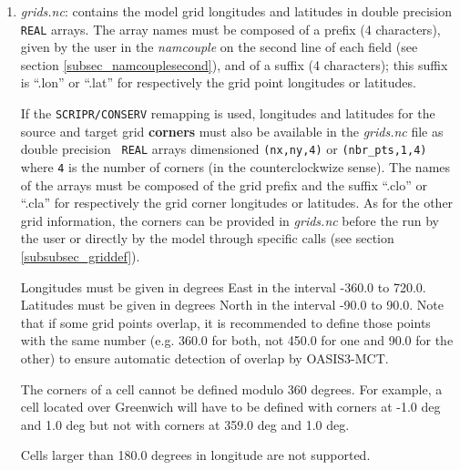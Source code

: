 \begin{enumerate}

\item {\em grids.nc}: contains the model grid longitudes and latitudes
  in double precision {\tt REAL} arrays. The array names must be
  composed of a prefix (4 characters), given by the user in the {\it
    namcouple} on the second line of each field (see section
  \ref{subsec_namcouplesecond}), and of a suffix (4 characters); this
  suffix is ``.lon'' or ``.lat'' for respectively the grid point
  longitudes or latitudes.

  If the {\tt SCRIPR/CONSERV} remapping is used, longitudes and
  latitudes for the source and target grid {\bf corners} must also be
  available in the {\em grids.nc} file as double precision {\tt
    REAL} arrays dimensioned {\tt (nx,ny,4)} or {\tt (nbr\_pts,1,4)}
  where {\tt 4} is the number of corners (in the counterclockwize
  sense). The names of the arrays must be composed of the grid prefix
  and the suffix ``.clo'' or ``.cla'' for respectively the grid corner
  longitudes or latitudes.  As for the other grid information, the
  corners can be provided in {\em grids.nc} before the run by the user
  or directly by the model through specific calls (see section
  \ref{subsubsec_griddef}).

 
  Longitudes must be given in degrees East in the interval -360.0 to
  720.0. Latitudes must be given in degrees North in the interval
  -90.0 to 90.0. Note that if some grid points overlap, it is
  recommended to define those points with the same number (e.g. 360.0
  for both, not 450.0 for one and 90.0 for the other) to ensure
  automatic detection of overlap by OASIS3-MCT.
 
  The corners of a cell cannot be defined modulo 360 degrees. For
  example, a cell located over Greenwich will have to be defined with
  corners at -1.0 deg and 1.0 deg but not with corners at 359.0 deg
  and 1.0 deg.
 
  Cells larger than 180.0 degrees in longitude are not supported.
 

\end{enumerate}
